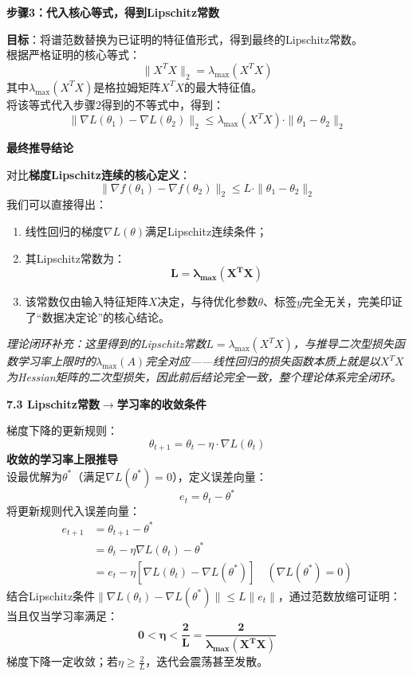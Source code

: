\documentclass[10pt]{article}
\numberwithin{equation}{section}
\theoremstyle{plain}
\theoremstyle{definition}
\theoremstyle{remark}
\begin{document}
{\par\vspace{0.8ex}\noindent\normalsize\bfseries\color{secblue} 步骤3：代入核心等式，得到Lipschitz常数\par}
\textbf{目标}：将谱范数替换为已证明的特征值形式，得到最终的Lipschitz常数。\\
根据严格证明的核心等式：
\[ \|X^T X\|_2 = \lambda_{\text{max}}(X^T X) \]
其中$\lambda_{\text{max}}(X^T X)$是格拉姆矩阵$X^T X$的最大特征值。\\
将该等式代入步骤2得到的不等式中，得到：
\[ \|\nabla L(\theta_1) - \nabla L(\theta_2)\|_2 \le \lambda_{\text{max}}(X^T X) \cdot \| \theta_1 - \theta_2 \|_2 \]

{\par\vspace{0.8ex}\noindent\normalsize\bfseries\color{secblue} 最终推导结论\par}
对比\textbf{梯度Lipschitz连续的核心定义}：
\[ \|\nabla f(\theta_1) - \nabla f(\theta_2)\|_2 \le L \cdot \|\theta_1 - \theta_2\|_2 \]
我们可以直接得出：
\begin{enumerate}[label=\arabic*., leftmargin=*]
    \item 线性回归的梯度$\nabla L(\theta)$满足Lipschitz连续条件；
    \item 其Lipschitz常数为：
    \[ \boldsymbol{L = \lambda_{\text{max}}(X^T X)} \]
    \item 该常数仅由输入特征矩阵$X$决定，与待优化参数$\theta$、标签$y$完全无关，完美印证了“数据决定论”的核心结论。
\end{enumerate}
\textit{理论闭环补充：这里得到的Lipschitz常数$L=\lambda_{\text{max}}(X^T X)$，与推导二次型损失函数学习率上限时的$\lambda_{\text{max}}(A)$完全对应——线性回归的损失函数本质上就是以$X^T X$为Hessian矩阵的二次型损失，因此前后结论完全一致，整个理论体系完全闭环。}

{\par\vspace{0.8ex}\noindent\normalsize\bfseries\color{accentD} 7.3 Lipschitz常数$\rightarrow$学习率的收敛条件\par}
梯度下降的更新规则：
\[ \theta_{t+1} = \theta_t - \eta \cdot \nabla L(\theta_t) \]
\textbf{收敛的学习率上限推导}\\
设最优解为$\theta^*$（满足$\nabla L(\theta^*)=0$），定义误差向量：
\[ e_t = \theta_t - \theta^* \]
将更新规则代入误差向量：
\[
\begin{aligned}
e_{t+1} &= \theta_{t+1} - \theta^* \\
&= \theta_t - \eta \nabla L(\theta_t) - \theta^* \\
&= e_t - \eta \left[ \nabla L(\theta_t) - \nabla L(\theta^*) \right] \quad (\nabla L(\theta^*)=0)
\end{aligned}
\]
结合Lipschitz条件$\|\nabla L(\theta_t)-\nabla L(\theta^*)\| \le L \|e_t\|$，通过范数放缩可证明：\\
当且仅当学习率满足：
\[ \boldsymbol{0 < \eta < \frac{2}{L} = \frac{2}{\lambda_{\text{max}}(X^T X)}} \]
梯度下降一定收敛；若$\eta \ge \frac{2}{L}$，迭代会震荡甚至发散。
\end{document}

